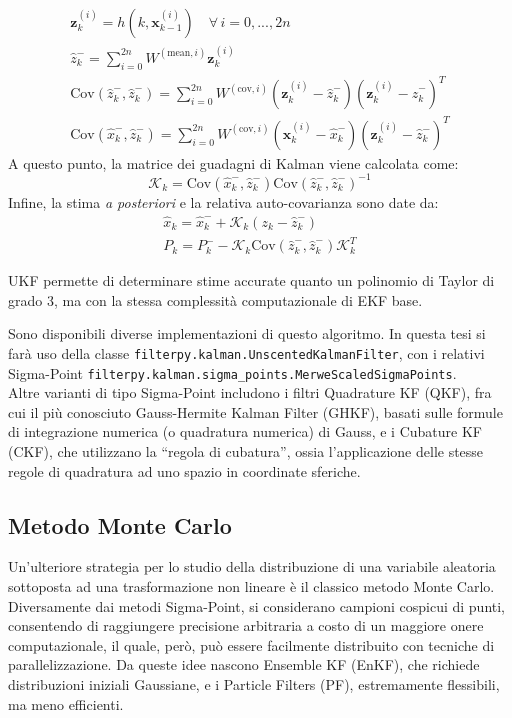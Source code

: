 \documentclass[12pt,a4paper,openright,twoside]{book}
\begin{document}
\begin{gather*}
\mathbf{z}_k^{(i)}=h(k,\mathbf{x}_{k-1}^{(i)})\quad\forall\,i=0,...,2n \\
\hat{z}_k^-=\sum_{i=0}^{2n}W^{(\text{mean},i)}\mathbf{z}_k^{(i)} \\
\mathrm{Cov}(\hat{z}_k^-,\hat{z}_k^-)=\sum_{i=0}^{2n}W^{(\text{cov},i)}\left(\mathbf{z}_k^{(i)}-\hat{z}_k^-\right)\left(\mathbf{z}_k^{(i)}-\hat{z}_k^-\right)^T \\
\mathrm{Cov}(\hat{x}_k^-,\hat{z}_k^-)=\sum_{i=0}^{2n}W^{(\text{cov},i)}\left(\mathbf{x}_k^{(i)}-\hat{x}_k^-\right)\left(\mathbf{z}_k^{(i)}-\hat{z}_k^-\right)^T
\end{gather*}
A questo punto, la matrice dei guadagni di Kalman viene calcolata come:
\begin{equation*}
\mathcal{K}_k=\mathrm{Cov}(\hat{x}_k^-,\hat{z}_k^-)\mathrm{Cov}(\hat{z}_k^-,\hat{z}_k^-)^{-1}
\end{equation*}
Infine, la stima \textit{a posteriori} e la relativa auto-covarianza sono date da:
\begin{gather*}
\hat{x}_k=\hat{x}_k^-+\mathcal{K}_k(z_k-\hat{z}_k^-) \\
P_k=P_k^--\mathcal{K}_k\mathrm{Cov}(\hat{z}_k^-,\hat{z}_k^-)\mathcal{K}_k^T
\end{gather*}

UKF permette di determinare stime accurate quanto un polinomio di Taylor di grado 3, ma con la stessa complessità computazionale di EKF base.

Sono disponibili diverse implementazioni di questo algoritmo. In questa tesi si farà uso della classe \lstinline{filterpy.kalman.UnscentedKalmanFilter}, con i relativi Sigma-Point \lstinline{filterpy.kalman.sigma_points.MerweScaledSigmaPoints}. \\

Altre varianti di tipo Sigma-Point includono i filtri Quadrature KF (QKF), fra cui il più conosciuto Gauss-Hermite Kalman Filter (GHKF), basati sulle formule di integrazione numerica (o quadratura numerica) di Gauss, e i Cubature KF (CKF), che utilizzano la ``regola di cubatura'', ossia l'applicazione delle stesse regole di quadratura ad uno spazio in coordinate sferiche.

\subsection{Metodo Monte Carlo}

Un'ulteriore strategia per lo studio della distribuzione di una variabile aleatoria sottoposta ad una trasformazione non lineare è il classico metodo Monte Carlo. Diversamente dai metodi Sigma-Point, si considerano campioni cospicui di punti, consentendo di raggiungere precisione arbitraria a costo di un maggiore onere computazionale, il quale, però, può essere facilmente distribuito con tecniche di parallelizzazione. Da queste idee nascono Ensemble KF (EnKF), che richiede distribuzioni iniziali Gaussiane, e i Particle Filters (PF), estremamente flessibili, ma meno efficienti.
\end{document}
